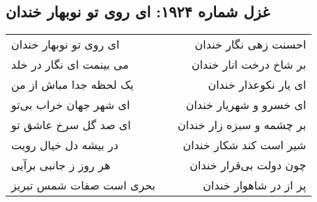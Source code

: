 \begin{center}
\section*{غزل شماره ۱۹۲۴: ای روی تو نوبهار خندان}
\label{sec:1924}
\begin{longtable}{l p{0.5cm} r}
ای روی تو نوبهار خندان
&&
احسنت زهی نگار خندان
\\
می بینمت ای نگار در خلد
&&
بر شاخ درخت انار خندان
\\
یک لحظه جدا مباش از من
&&
ای یار نکوعذار خندان
\\
ای شهر جهان خراب بی‌تو
&&
ای خسرو و شهریار خندان
\\
ای صد گل سرخ عاشق تو
&&
بر چشمه و سبزه زار خندان
\\
در بیشه دل خیال رویت
&&
شیر است کند شکار خندان
\\
هر روز ز جانبی برآیی
&&
چون دولت بی‌قرار خندان
\\
بحری است صفات شمس تبریز
&&
پر از در شاهوار خندان
\\
\end{longtable}
\end{center}
